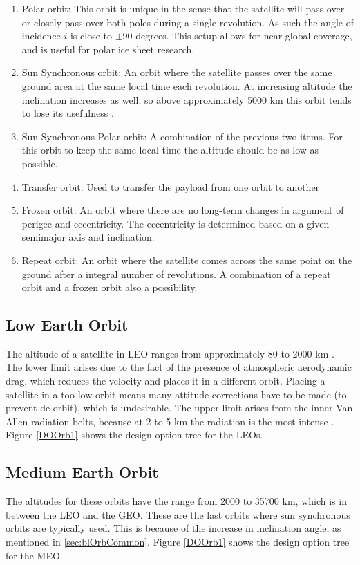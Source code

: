 \begin{enumerate}
	\item Polar orbit:
	This orbit is unique in the sense that the satellite will pass over or closely pass over both poles during a single revolution. As such the angle of incidence $i$ is close to  $\pm$90 degrees. This setup allows for near global coverage, and is useful for polar ice sheet research.
	\item Sun Synchronous orbit:
	An orbit where the satellite passes over the same ground area at the same local time each revolution. At increasing altitude the inclination increases as well, so above approximately 5000 km this orbit tends to lose its usefulness \cite{larson}. 
	\item Sun Synchronous Polar orbit:
	A combination of the previous two items. For this orbit to keep the same local time the altitude should be as low as possible.
	\item Transfer orbit:
	Used to transfer the payload from one orbit to another
	\item Frozen orbit:
	An orbit where there are no long-term changes in argument of perigee and eccentricity. The eccentricity is determined based on a given semimajor axis and inclination.
	\item Repeat orbit:
	An orbit where the satellite comes across the same point on the ground after a integral number of revolutions. A combination of a repeat orbit and a frozen orbit also a possibility.
\end{enumerate}

\subsection{Low Earth Orbit}
\label{sec:blOrb1}
The altitude of a satellite in \acs{LEO} ranges from approximately 80 to 2000 km \cite{nasaOrbit}. The lower limit arises due to the fact of the presence of atmospheric aerodynamic drag, which reduces the velocity and places it in a different orbit. Placing a satellite in a too low orbit means many attitude corrections have to be made (to prevent de-orbit), which is undesirable. The upper limit arises from the inner Van Allen radiation belts, because at 2 to 5 km the radiation is the most intense \cite{sse}. Figure \ref{DOOrb1} shows the design option tree for the \ac{LEO}s.

\subsection{Medium Earth Orbit}
\label{sec:blOrb2}
The altitudes for these orbits have the range from 2000 to 35700 km, which is in between the \acs{LEO} and the \ac{GEO}. These are the last orbits where sun synchronous orbits are typically used. This is because of the increase in inclination angle, as mentioned in \ref{sec:blOrbCommon}. Figure \ref{DOOrb1} shows the design option tree for the \ac{MEO}.

